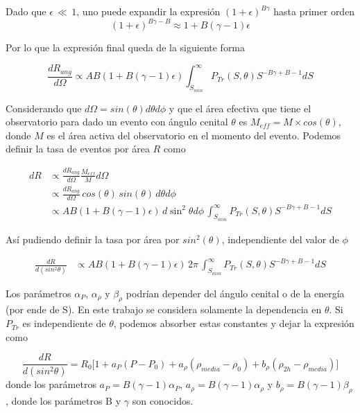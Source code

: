 Dado que $\epsilon\,\ll\,1$, uno puede expandir la expresión $(1+\epsilon)^{B\gamma}$ hasta primer orden 
\begin{equation*}
	(1+\epsilon)^{B\gamma-B} \approx 1 + B(\gamma-1)\epsilon
\end{equation*}

Por lo que la expresión final queda de la siguiente forma

\begin{equation*}
	\frac{dR_{ang}}{d\Omega} \propto AB(1+B(\gamma - 1)\epsilon)\int_{S_{min}}^{\infty} P_{Tr}(S,\theta) S^{-B\gamma +B -1} dS
\end{equation*}

Considerando que $d\Omega= sin(\theta)d\theta d\phi$ y que el área efectiva  que tiene el observatorio para dado un evento con ángulo cenital $\theta$ es $M_{eff}=M\times cos(\theta)$, donde $M$ es el área activa del observatorio en el momento del evento. Podemos definir la tasa de eventos por área $R$ como

\begin{align*}
	dR 	&\propto \frac{dR_{ang}}{d\Omega} \frac{M_{eff}}{M} d\Omega \\
		&\propto \frac{dR_{ang}}{d\Omega}\, cos(\theta)\, sin(\theta)\,d\theta d\phi\\
		&\propto  AB(1+B(\gamma - 1)\epsilon)\,d\sin^2\theta d\phi\,\int_{S_{min}}^{\infty} P_{Tr}(S,\theta) S^{-B\gamma +B -1} dS
\end{align*}

Así pudiendo definir la tasa por área por $sin^2(\theta)$, independiente del valor de $\phi$

\begin{align*}
	\frac{dR}{d(sin^2\theta)} &\propto AB(1+B(\gamma-1)\epsilon)\, 2\pi \,\int_{S_{min}}^{\infty} P_{Tr}(S,\theta) S^{-B\gamma +B -1} dS
\end{align*}

Los parámetros $\alpha_P$, $\alpha_{\rho}$ y $\beta_{\rho}$ podrían depender del ángulo cenital o de la energía (por ende de S). En este trabajo se considera solamente la dependencia en $\theta$. Si $P_{Tr}$ es independiente de $\theta$, podemos absorber estas constantes y dejar la expresión como

\begin{equation}
	\frac{dR}{d(sin^2\theta)} = R_0\bigg[1+a_P(P-P_0) +a_{\rho}(\rho_{media}-\rho_0) + b_{\rho}(\rho_{2h}-\rho_{media})\bigg] 
	\label{eq:rate_sin2}
\end{equation}
donde los parámetros $a_P=B(\gamma-1)\alpha_{P}$, $a_{\rho}=B(\gamma-1)\alpha_{\rho}$ y $b_{\rho}=B(\gamma-1)\beta_{\rho}$, donde los parámetros B y $\gamma$ son conocidos.

